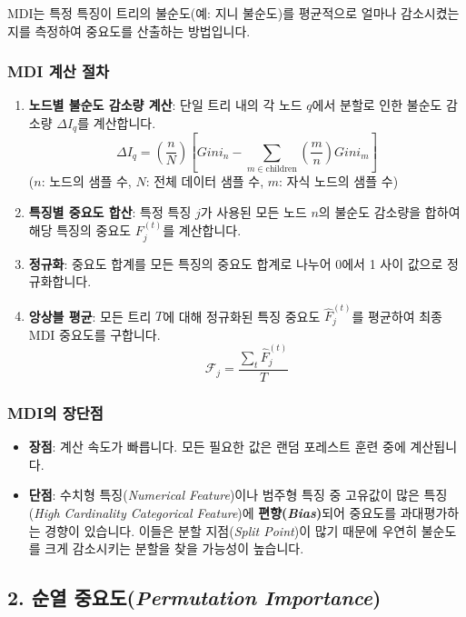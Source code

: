 \documentclass[11pt,a4paper]{book}
\theoremstyle{definition}
\begin{document}
\begin{tcolorbox}[infobox]
MDI는 특정 특징이 트리의 불순도(예: 지니 불순도)를 평균적으로 얼마나 감소시켰는지를 측정하여 중요도를 산출하는 방법입니다.
\end{tcolorbox}

\subsubsection*{MDI 계산 절차}
\begin{enumerate}
    \item \textbf{노드별 불순도 감소량 계산}: 단일 트리 내의 각 노드 $q$에서 분할로 인한 불순도 감소량 $\Delta I_q$를 계산합니다.
    $$\Delta I_{q}=(\frac{n}{N})\left[Gini_{n}-\sum_{m\in \text{children}}(\frac{m}{n})Gini_{m}\right]$$
    ($n$: 노드의 샘플 수, $N$: 전체 데이터 샘플 수, $m$: 자식 노드의 샘플 수)
    \item \textbf{특징별 중요도 합산}: 특정 특징 $j$가 사용된 모든 노드 $n$의 불순도 감소량을 합하여 해당 특징의 중요도 $F_j^{(t)}$를 계산합니다.
    \item \textbf{정규화}: 중요도 합계를 모든 특징의 중요도 합계로 나누어 0에서 1 사이 값으로 정규화합니다.
    \item \textbf{앙상블 평균}: 모든 트리 $T$에 대해 정규화된 특징 중요도 $\hat{F}_j^{(t)}$를 평균하여 최종 MDI 중요도를 구합니다.
    $$\mathcal{F}_{j}=\frac{\sum_{t}\hat{F}_{j}^{(t)}}{T}$$
\end{enumerate}

\subsubsection*{MDI의 장단점}
\begin{itemize}
    \item \textbf{장점}: 계산 속도가 빠릅니다. 모든 필요한 값은 랜덤 포레스트 훈련 중에 계산됩니다.
    \item \textbf{단점}: 수치형 특징(\emph{Numerical Feature})이나 범주형 특징 중 고유값이 많은 특징(\emph{High Cardinality Categorical Feature})에 \textbf{편향(\emph{Bias})}되어 중요도를 과대평가하는 경향이 있습니다. 이들은 분할 지점(\emph{Split Point})이 많기 때문에 우연히 불순도를 크게 감소시키는 분할을 찾을 가능성이 높습니다.
\end{itemize}

\subsection{2. 순열 중요도(\emph{Permutation Importance})}
\end{document}
